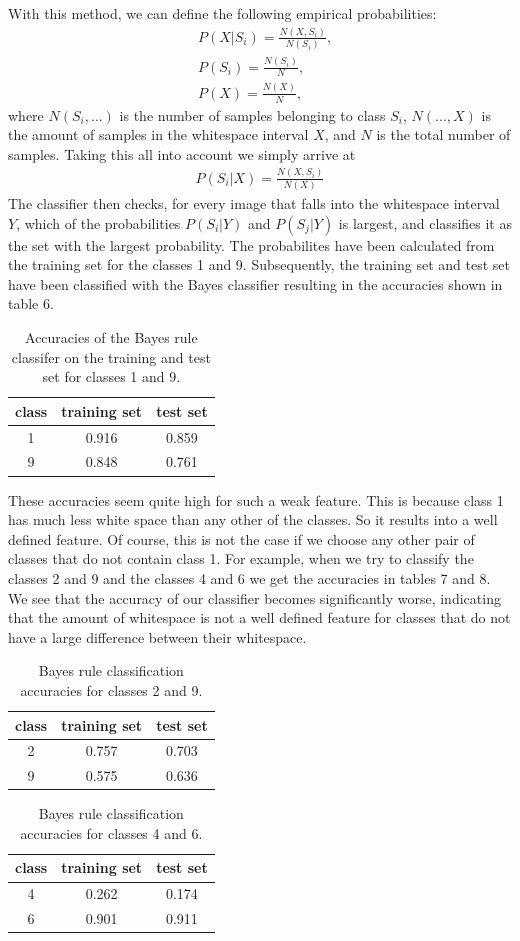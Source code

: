\documentclass[11pt]{article}
\begin{document}
With this method, we can define the following empirical probabilities:\vspace*{2mm}
\begin{align}
&P(X|S_i)=\frac{N(X, S_i)}{N(S_i)},\\[2mm]
&P(S_i)=\frac{N(S_i)}{N},\\[2mm]
&P(X)=\frac{N(X)}{N},
\end{align}
where $N(S_i, ...)$ is the number of samples belonging to class $S_i$, $N(..., X)$ is the amount of samples in the whitespace interval $X$, and $N$ is the total number of samples. Taking this all into account we simply arrive at
\begin{align}
P(S_i|X)=\frac{N(X, S_i)}{N(X)}
\end{align}
The classifier then checks, for every image that falls into the whitespace interval $Y$, which of the probabilities $P(S_i|Y)$ and $P(S_j|Y)$ is largest, and classifies it as the set with the largest probability. The probabilites have been calculated from the training set for the classes 1 and 9. Subsequently, the training set and test set have been classified with the Bayes classifier resulting in the accuracies shown in table 6.\par
\begin{table}[t]
\centering
\small
\begin{tabular}{c|cc}
class&training set&test set\\\hline
1&0.916&0.859\\
9&0.848&0.761\\
\end{tabular}
\caption{Accuracies of the Bayes rule classifer on the training and test set for classes 1 and 9.}
\normalsize
\end{table}
These accuracies seem quite high for such a weak feature. This is because class 1 has much less white space than any other of the classes. So it results into a well defined feature. Of course, this is not the case if we choose any other pair of classes that do not contain class 1. For example, when we try to classify the classes 2 and 9 and the classes 4 and 6 we get the accuracies in tables 7 and 8.
We see that the accuracy of our classifier becomes significantly worse, indicating that the amount of whitespace is not a well defined feature for classes that do not have a large difference between their whitespace.
\begin{table}[!h]
\centering
\small
\begin{tabular}{c|cc}
class&training set&test set\\\hline
2&0.757&0.703\\
9&0.575&0.636
\end{tabular}
\caption{Bayes rule classification accuracies for classes 2 and 9.}
\normalsize
\end{table}
\begin{table}[!h]
\centering
\small
\begin{tabular}{c|cc}
class&training set&test set\\\hline
4&0.262&0.174\\
6&0.901&0.911
\end{tabular}
\caption{Bayes rule classification accuracies for classes 4 and 6.}
\normalsize
\end{table}
\end{document}
